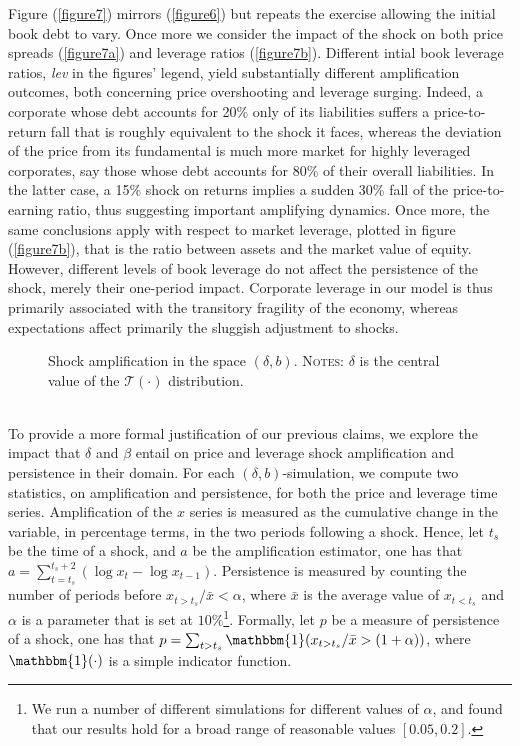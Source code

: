 \documentclass[11pt]{article}
\begin{document}
Figure (\ref{figure7}) mirrors (\ref{figure6}) but repeats the exercise allowing the initial book debt to vary. Once more we consider the impact of the shock on both price spreads (\ref{figure7a}) and leverage ratios (\ref{figure7b}). Different intial book leverage ratios, \emph{lev} in the figures' legend, yield substantially different amplification outcomes, both concerning price overshooting and leverage surging. Indeed, a corporate whose debt accounts for 20\% only of its liabilities suffers a price-to-return fall that is roughly equivalent to the shock it faces, whereas the deviation of the price from its fundamental is much more market for highly leveraged corporates, say those whose debt accounts for 80\% of their overall liabilities. In the latter case, a 15\% shock on returns implies a sudden 30\% fall of the price-to-earning ratio, thus suggesting important amplifying dynamics. Once more, the same conclusions apply with respect to market leverage, plotted in figure (\ref{figure7b}), that is the ratio between assets and the market value of equity.\\
However, different levels of book leverage do not affect the persistence of the shock, merely their one-period impact. Corporate leverage in our model is thus primarily associated with the transitory fragility of the economy, whereas expectations affect primarily the sluggish adjustment to shocks.\\
\begin{figure}[h!]
\centering
{}\quad
{}
 \caption{Shock amplification in the space $(\delta,b)$. \textsc{Notes}: $\delta$ is the central value of the $\mathcal{T}(\cdot)$ distribution.} \label{figure13}
\end{figure}\\
To provide a more formal justification of our previous claims, we explore the impact that $\delta$ and $\beta$ entail on price and leverage shock amplification and persistence in their domain. For each $(\delta,b)$-simulation, we compute two statistics, on amplification and persistence, for both the price and leverage time series. Amplification of the $x$ series is measured as the cumulative change in the variable, in percentage terms, in the two periods following a shock. Hence, let $t_s$ be the time of a shock, and $a$ be the amplification estimator, one has that $a = \sum_{t=t_s}^{t_s+2} (\log x_{t}-\log x_{t-1})$. Persistence is measured by counting the number of periods before $x_{t>t_s}/\bar{x} < \alpha$, where $\bar{x}$ is the average value of $x_{t<t_s}$ and $\alpha$ is a parameter that is set at $10\%$\footnote{We run a number of different simulations for different values of $\alpha$, and found that our results hold for a broad range of reasonable values $[0.05,0.2]$.}. Formally, let $p$ be a measure of persistence of a shock, one has that $p = \sum_{t>t_s} \mathbbm{1}(x_{t>t_s}/\bar{x} > (1+\alpha))$, where $\mathbbm{1}(\cdot)$ is a simple indicator function.\\
\end{document}
